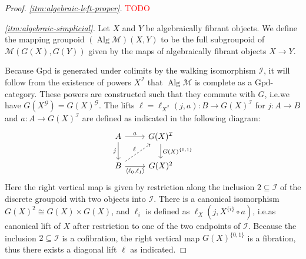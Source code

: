 \documentclass{article}
\newcommand{\todo}[1]{\textcolor{red}{#1}}
\theoremstyle{remark}
\theoremstyle{definition}
\begin{document}
\begin{proof}
  \emph{\ref{itm:algebraic-left-proper}.}
  \todo{TODO}

  \emph{\ref{itm:algebraic-simplicial}.}
  Let $X$ and $Y$ be algebraically fibrant objects.
  We define the mapping groupoid $(\operatorname{Alg} \mathcal{M})(X, Y)$ to be the full subgroupoid of $\mathcal{M}(G(X), G(Y))$ given by the maps of algebraically fibrant objects $X \rightarrow Y$.

  Because $\mathrm{Gpd}$ is generated under colimits by the walking isomorphism $\mathcal{I}$, it will follow from the existence of powers $X^\mathcal{I}$ that $\operatorname{Alg} \mathcal{M}$ is complete as a $\mathrm{Gpd}$-category.
  These powers are constructed such that they commute with $G$, i.e.\@ we have $G(X^\mathcal{G}) = G(X)^\mathcal{G}$.
  The lifts $\ell = \ell_{X^\mathcal{I}}(j, a) : B \rightarrow G(X)^\mathcal{I}$ for $j : A \rightarrow B$ and $a : A \rightarrow G(X)^\mathcal{I}$ are defined as indicated in the following diagram:
  \begin{equation}
    \begin{tikzcd}
      A \arrow[r, "a"] \arrow[d, "j"'] & G(X)^\mathcal{I} \arrow[d, "G(X)^{\{0, 1\}}"] \\
      B \arrow[r, "{\langle \ell_0, \ell_1 \rangle}"'] \arrow[ur, dashed, "\ell"] & G(X)^2
    \end{tikzcd}
    \label{eq:lift-in-power}
  \end{equation}
  Here the right vertical map is given by restriction along the inclusion $2 \subseteq \mathcal{I}$ of the discrete groupoid with two objects into $\mathcal{I}$.
  There is a canonical isomorphism $G(X)^2 \cong G(X) \times G(X)$, and $\ell_i$ is defined as $\ell_X(j, X^{\{i\}} \circ a)$, i.e.\@ as canonical lift of $X$ after restriction to one of the two endpoints of $\mathcal{I}$.
  Because the inclusion $2 \subseteq \mathcal{I}$ is a cofibration, the right vertical map $G(X)^{\{0, 1\}}$ is a fibration, thus there exists a diagonal lift $\ell$ as indicated.


\end{proof}
\end{document}
